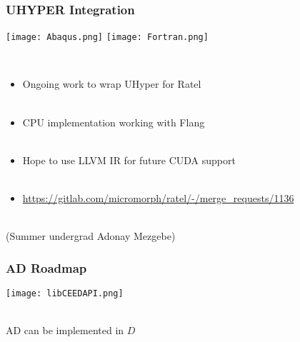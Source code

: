 \documentclass{beamer}
\begin{document}
\begin{frame}
\begin{center}
\frametitle{UHYPER Integration}

\texttt{[image: Abaqus.png]} \hspace*{1cm} \texttt{[image: Fortran.png]}

~\\

\begin{itemize}

\item Ongoing work to wrap UHyper for Ratel\\

~\\

\item CPU implementation working with Flang\\

~\\

\item Hope to use LLVM IR for future CUDA support\\

~\\

\item \href{https://gitlab.com/micromorph/ratel/-/merge\_requests/1136}{https://gitlab.com/micromorph/ratel/-/merge\_requests/1136}\\

\end{itemize}

~\\

(Summer undergrad Adonay Mezgebe)

\end{center}
\end{frame}


\begin{frame}
\begin{center}
\frametitle{AD Roadmap}

\texttt{[image: libCEEDAPI.png]}

~\\

AD can be implemented in {\color{applegreen}$D$}

\end{center}
\end{frame}
\end{document}
